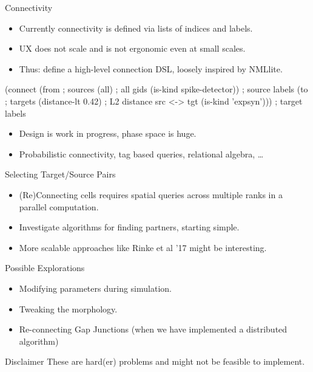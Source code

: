 \documentclass{beamer}
\begin{document}
\begin{frame}[fragile]{Connectivity}
  \begin{itemize}
    \item Currently connectivity is defined via lists of indices and labels.
    \item UX does not scale and is not ergonomic even at small scales.
    \item Thus: define a high-level connection DSL, loosely inspired by NMLlite.
  \end{itemize}
  \begin{codePythonblock}
  (connect
    (from                         ; sources
      (all)                       ; all gids
      (is-kind spike-detector))   ; source labels
    (to                           ; targets
      (distance-lt 0.42)          ; L2 distance src <-> tgt
      (is-kind 'expsyn')))        ; target labels
  \end{codePythonblock}
  \begin{itemize}
    \item Design is work in progress, phase space is huge.
    \item Probabilistic connectivity, tag based queries, relational algebra, \dots
  \end{itemize}
\end{frame}

\begin{frame}[fragile]{Selecting Target/Source Pairs}
  \begin{itemize}
    \item (Re)Connecting cells requires spatial queries across multiple ranks in
          a parallel computation.
    \item Investigate algorithms for finding partners, starting simple.
    \item More scalable approaches like Rinke et al '17 might be interesting.
  \end{itemize}
\end{frame}

\begin{frame}[fragile]{Possible Explorations}
  \begin{itemize}
    \item Modifying parameters during simulation.
    \item Tweaking the morphology.
    \item Re-connecting Gap Junctions (when we have implemented a distributed
          algorithm)
  \end{itemize}
  \begin{block}{Disclaimer}
    These are hard(er) problems and might not be feasible to implement.
  \end{block}
\end{frame}
\end{document}
